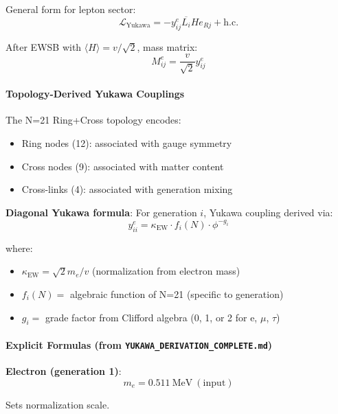 \documentclass[12pt,a4paper]{article}
\begin{document}
General form for lepton sector:
\begin{equation}
\mathcal{L}_{\mathrm{Yukawa}} = -y_{ij}^e \overline{L_i} H e_{Rj} + \mathrm{h.c.}
\end{equation}

After EWSB with $\langle H \rangle = v/\sqrt{2}$, mass matrix:
\begin{equation}
M_{ij}^e = \frac{v}{\sqrt{2}} y_{ij}^e
\end{equation}

\paragraph{Topology-Derived Yukawa Couplings}

The N=21 Ring+Cross topology encodes:
\begin{itemize}
\item Ring nodes (12): associated with gauge symmetry
\item Cross nodes (9): associated with matter content
\item Cross-links (4): associated with generation mixing
\end{itemize}

\textbf{Diagonal Yukawa formula}: For generation $i$, Yukawa coupling derived via:
\begin{equation}
y_{ii}^e = \kappa_{\mathrm{EW}} \cdot f_i(N) \cdot \phi^{-g_i}
\end{equation}

where:
\begin{itemize}
\item $\kappa_{\mathrm{EW}} = \sqrt{2} m_e / v$ (normalization from electron mass)
\item $f_i(N) = $ algebraic function of N=21 (specific to generation)
\item $g_i = $ grade factor from Clifford algebra (0, 1, or 2 for e, $\mu$, $\tau$)
\end{itemize}

\paragraph{Explicit Formulas (from \texttt{YUKAWA\_DERIVATION\_COMPLETE.md})}

\textbf{Electron (generation 1)}:
\begin{equation}
m_e = 0.511\ \mathrm{MeV}\ (\mathrm{input})
\end{equation}

Sets normalization scale.
\end{document}
